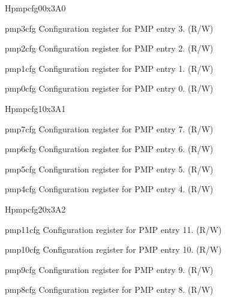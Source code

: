 \begin{register}{H}{pmpcfg0}{0x3A0}
\label{regdesc:pmpcfg0}%
%
%
%
%
\regnewline%
\begin{regdesc}
\begin{reglist}
\label{fielddesc:pmp3cfg}\item [pmp3cfg] Configuration register for PMP entry 3. (R/W)
\label{fielddesc:pmp2cfg}\item [pmp2cfg] Configuration register for PMP entry 2. (R/W)
\label{fielddesc:pmp1cfg}\item [pmp1cfg] Configuration register for PMP entry 1. (R/W)
\label{fielddesc:pmp0cfg}\item [pmp0cfg] Configuration register for PMP entry 0. (R/W)
\end{reglist}
\end{regdesc}
\end{register}

\begin{register}{H}{pmpcfg1}{0x3A1}
\label{regdesc:pmpcfg1}%
%
%
%
%
\regnewline%
\begin{regdesc}
\begin{reglist}
\label{fielddesc:pmp7cfg}\item [pmp7cfg] Configuration register for PMP entry 7. (R/W)
\label{fielddesc:pmp6cfg}\item [pmp6cfg] Configuration register for PMP entry 6. (R/W)
\label{fielddesc:pmp5cfg}\item [pmp5cfg] Configuration register for PMP entry 5. (R/W)
\label{fielddesc:pmp4cfg}\item [pmp4cfg] Configuration register for PMP entry 4. (R/W)
\end{reglist}
\end{regdesc}
\end{register}

\begin{register}{H}{pmpcfg2}{0x3A2}
\label{regdesc:pmpcfg2}%
%
%
%
%
\regnewline%
\begin{regdesc}
\begin{reglist}
\label{fielddesc:pmp11cfg}\item [pmp11cfg] Configuration register for PMP entry 11. (R/W)
\label{fielddesc:pmp10cfg}\item [pmp10cfg] Configuration register for PMP entry 10. (R/W)
\label{fielddesc:pmp9cfg}\item [pmp9cfg] Configuration register for PMP entry 9. (R/W)
\label{fielddesc:pmp8cfg}\item [pmp8cfg] Configuration register for PMP entry 8. (R/W)
\end{reglist}
\end{regdesc}
\end{register}

